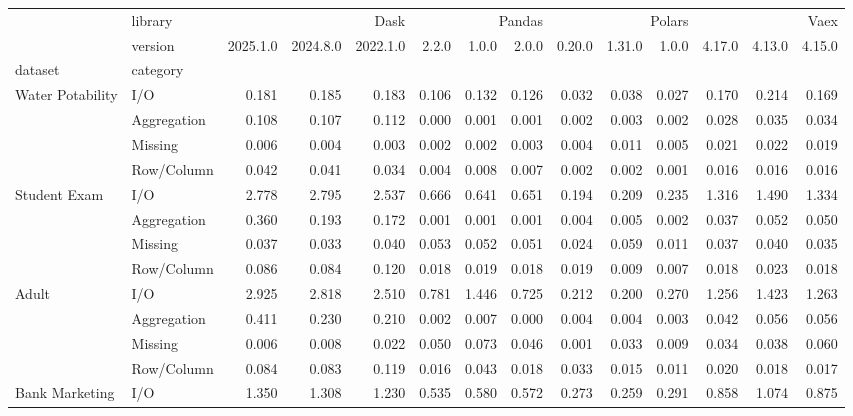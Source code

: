 \begin{tabular}{llrrrrrrrrrrrr}
\toprule
 & library & \multicolumn{3}{r}{Dask} & \multicolumn{3}{r}{Pandas} & \multicolumn{3}{r}{Polars} & \multicolumn{3}{r}{Vaex} \\
 & version & 2025.1.0 & 2024.8.0 & 2022.1.0 & 2.2.0 & 1.0.0 & 2.0.0 & 0.20.0 & 1.31.0 & 1.0.0 & 4.17.0 & 4.13.0 & 4.15.0 \\
dataset & category &  &  &  &  &  &  &  &  &  &  &  &  \\
\midrule
\multirow[t]{4}{*}{Water Potability} & I/O & 0.181 & 0.185 & 0.183 & 0.106 & 0.132 & 0.126 & 0.032 & 0.038 & 0.027 & 0.170 & 0.214 & 0.169 \\
 & Aggregation & 0.108 & 0.107 & 0.112 & 0.000 & 0.001 & 0.001 & 0.002 & 0.003 & 0.002 & 0.028 & 0.035 & 0.034 \\
 & Missing & 0.006 & 0.004 & 0.003 & 0.002 & 0.002 & 0.003 & 0.004 & 0.011 & 0.005 & 0.021 & 0.022 & 0.019 \\
 & Row/Column & 0.042 & 0.041 & 0.034 & 0.004 & 0.008 & 0.007 & 0.002 & 0.002 & 0.001 & 0.016 & 0.016 & 0.016 \\
\cline{1-14}
\multirow[t]{4}{*}{Student Exam} & I/O & 2.778 & 2.795 & 2.537 & 0.666 & 0.641 & 0.651 & 0.194 & 0.209 & 0.235 & 1.316 & 1.490 & 1.334 \\
 & Aggregation & 0.360 & 0.193 & 0.172 & 0.001 & 0.001 & 0.001 & 0.004 & 0.005 & 0.002 & 0.037 & 0.052 & 0.050 \\
 & Missing & 0.037 & 0.033 & 0.040 & 0.053 & 0.052 & 0.051 & 0.024 & 0.059 & 0.011 & 0.037 & 0.040 & 0.035 \\
 & Row/Column & 0.086 & 0.084 & 0.120 & 0.018 & 0.019 & 0.018 & 0.019 & 0.009 & 0.007 & 0.018 & 0.023 & 0.018 \\
\cline{1-14}
\multirow[t]{4}{*}{Adult} & I/O & 2.925 & 2.818 & 2.510 & 0.781 & 1.446 & 0.725 & 0.212 & 0.200 & 0.270 & 1.256 & 1.423 & 1.263 \\
 & Aggregation & 0.411 & 0.230 & 0.210 & 0.002 & 0.007 & 0.000 & 0.004 & 0.004 & 0.003 & 0.042 & 0.056 & 0.056 \\
 & Missing & 0.006 & 0.008 & 0.022 & 0.050 & 0.073 & 0.046 & 0.001 & 0.033 & 0.009 & 0.034 & 0.038 & 0.060 \\
 & Row/Column & 0.084 & 0.083 & 0.119 & 0.016 & 0.043 & 0.018 & 0.033 & 0.015 & 0.011 & 0.020 & 0.018 & 0.017 \\
\cline{1-14}
\multirow[t]{4}{*}{Bank Marketing} & I/O & 1.350 & 1.308 & 1.230 & 0.535 & 0.580 & 0.572 & 0.273 & 0.259 & 0.291 & 0.858 & 1.074 & 0.875 \\

\end{tabular}
